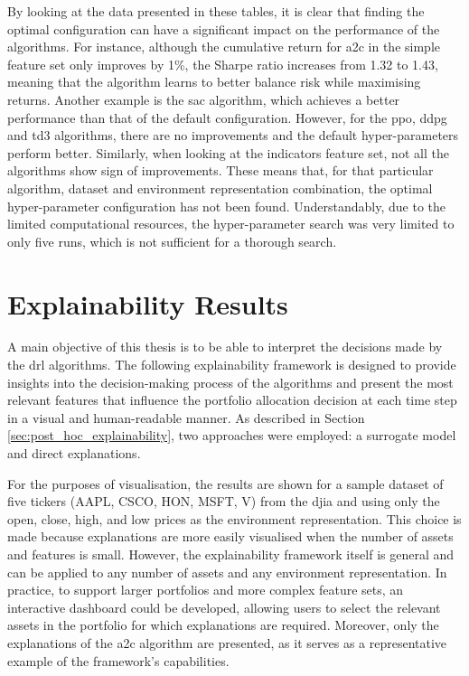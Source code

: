 


By looking at the data presented in these tables, it is clear that finding the optimal configuration can have a significant impact on the performance of the algorithms. For instance, although the cumulative return for \acrshort{a2c} in the simple feature set only improves by 1\%, the Sharpe ratio increases from 1.32 to 1.43, meaning that the algorithm learns to better balance risk while maximising returns. Another example is the \acrshort{sac} algorithm, which achieves a better performance than that of the default configuration. However, for the \acrshort{ppo}, \acrshort{ddpg} and \acrshort{td3} algorithms, there are no improvements and the default hyper-parameters perform better. Similarly, when looking at the indicators feature set, not all the algorithms show sign of improvements. These means that, for that particular algorithm, dataset and environment representation combination, the optimal hyper-parameter configuration has not been found. Understandably, due to the limited computational resources, the hyper-parameter search was very limited to only five runs, which is not sufficient for a thorough search.

\section{Explainability Results} \label{sec:explainability-framework}

A main objective of this thesis is to be able to interpret the decisions made by the \acrshort{drl} algorithms. The following explainability framework is designed to provide insights into the decision-making process of the algorithms and present the most relevant features that influence the portfolio allocation decision at each time step in a visual and human-readable manner. As described in Section \ref{sec:post_hoc_explainability}, two approaches were employed: a surrogate model and direct explanations. 

For the purposes of visualisation, the results are shown for a sample dataset of five tickers (AAPL, CSCO, HON, MSFT, V) from the \acrshort{djia} and using only the open, close, high, and low prices as the environment representation. This choice is made because explanations are more easily visualised when the number of assets and features is small. However, the explainability framework itself is general and can be applied to any number of assets and any environment representation. In practice, to support larger portfolios and more complex feature sets, an interactive dashboard could be developed, allowing users to select the relevant assets in the portfolio for which explanations are required. Moreover, only the explanations of the \acrshort{a2c} algorithm are presented, as it serves as a representative example of the framework's capabilities.

